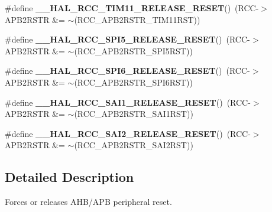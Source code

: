\begin{DoxyCompactItemize}
\#define {\bfseries \+\_\+\+\_\+\+H\+A\+L\+\_\+\+R\+C\+C\+\_\+\+T\+I\+M11\+\_\+\+R\+E\+L\+E\+A\+S\+E\+\_\+\+R\+E\+S\+ET}()~(R\+CC-\/$>$A\+P\+B2\+R\+S\+TR \&= $\sim$(R\+C\+C\+\_\+\+A\+P\+B2\+R\+S\+T\+R\+\_\+\+T\+I\+M11\+R\+ST))
\item 
\mbox{\label{group___r_c_c_ex___force___release___peripheral___reset_gaffa4ac19e4880063de6fe38ec07ef993}} 
\#define {\bfseries \+\_\+\+\_\+\+H\+A\+L\+\_\+\+R\+C\+C\+\_\+\+S\+P\+I5\+\_\+\+R\+E\+L\+E\+A\+S\+E\+\_\+\+R\+E\+S\+ET}()~(R\+CC-\/$>$A\+P\+B2\+R\+S\+TR \&= $\sim$(R\+C\+C\+\_\+\+A\+P\+B2\+R\+S\+T\+R\+\_\+\+S\+P\+I5\+R\+ST))
\item 
\mbox{\label{group___r_c_c_ex___force___release___peripheral___reset_gadc8c017d7fa2e91725be59bd017ae940}} 
\#define {\bfseries \+\_\+\+\_\+\+H\+A\+L\+\_\+\+R\+C\+C\+\_\+\+S\+P\+I6\+\_\+\+R\+E\+L\+E\+A\+S\+E\+\_\+\+R\+E\+S\+ET}()~(R\+CC-\/$>$A\+P\+B2\+R\+S\+TR \&= $\sim$(R\+C\+C\+\_\+\+A\+P\+B2\+R\+S\+T\+R\+\_\+\+S\+P\+I6\+R\+ST))
\item 
\mbox{\label{group___r_c_c_ex___force___release___peripheral___reset_ga6f43cdb59c0bf2f5315ff8a576db05ef}} 
\#define {\bfseries \+\_\+\+\_\+\+H\+A\+L\+\_\+\+R\+C\+C\+\_\+\+S\+A\+I1\+\_\+\+R\+E\+L\+E\+A\+S\+E\+\_\+\+R\+E\+S\+ET}()~(R\+CC-\/$>$A\+P\+B2\+R\+S\+TR \&= $\sim$(R\+C\+C\+\_\+\+A\+P\+B2\+R\+S\+T\+R\+\_\+\+S\+A\+I1\+R\+ST))
\item 
\mbox{\label{group___r_c_c_ex___force___release___peripheral___reset_ga7f4ac1e4ce92656c91279b64c8aae985}} 
\#define {\bfseries \+\_\+\+\_\+\+H\+A\+L\+\_\+\+R\+C\+C\+\_\+\+S\+A\+I2\+\_\+\+R\+E\+L\+E\+A\+S\+E\+\_\+\+R\+E\+S\+ET}()~(R\+CC-\/$>$A\+P\+B2\+R\+S\+TR \&= $\sim$(R\+C\+C\+\_\+\+A\+P\+B2\+R\+S\+T\+R\+\_\+\+S\+A\+I2\+R\+ST))
\end{DoxyCompactItemize}


\subsection{Detailed Description}
Forces or releases A\+H\+B/\+A\+PB peripheral reset. 

